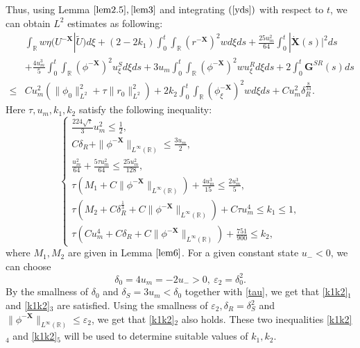 \documentclass[10pt,reqno]{amsart}
\numberwithin{equation}{section}
\begin{document}
	Thus, using Lemma $\ref{lem2.5},\ref{lem3}$ and integrating $(\ref{yds})$ with respect to $t$, we can obtain $L^2$ estimates as following:
	\begin{equation}\label{zero}
		\begin{aligned}
			&\int_{\mathbb{R}}w\eta(U^{-\mathbf{X}}|\tilde{U})d\xi+ \left(2-2k_{1}\right)\int_0^t\int_{\mathbb{R}}(r^{-\mathbf{X}})^2wd\xi ds + \frac{25u_m^2}{64}\int_0^t |\dot{\mathbf{X}}(s)|^2 ds \\
			&+ \frac{4u_m^3}{5}\int_0^t \int_{\mathbb{R}} (\phi^{-\mathbf{X}})^2u^S_{\xi}d\xi ds+3u_m\int_0^t \int_{\mathbb{R}} (\phi^{-\mathbf{X}})^2wu^R_\xi d\xi ds+2\int_0^t\mathbf{G}^{SR}(s)ds \\
			\leq& Cu_m^2 (\|\phi_0\|_{L^2}^2+\tau\|r_0\|_{L^2}^2 )+2k_2\int_{0}^t\int_{\mathbb{R}}\left(\phi_{\xi}^{-\mathbf{X}}\right)^2wd\xi ds+Cu_m^2\delta_R^{\frac{8}{33}}.
		\end{aligned}
	\end{equation} 
	Here $\tau,u_{m},k_1,k_2$ satisfy the following inequality:
	\begin{equation}\label{k1k2}
		\left\{\begin{array}{l}
			\frac{224\sqrt{\tau}}{3}u_m^2\leq \frac{1}{2} ,
			\\C\delta _R+\|\phi^{-\mathbf{X}}\|_{L^{\infty }(\mathbb{R})}\leq \frac{3u_m}{2}, 
			\\\frac{u_m^2}{64}+\frac{5\tau u_m^2}{64}\leq \frac{25u_m^2}{128},  
			\\\tau\left(M_1+C\|\phi^{-\mathbf{X}}\|_{L^{\infty }(\mathbb{R})} \right)+\frac{4u_m^3}{15}\leq \frac{2u_m^3}{5} ,
			\\\tau\left(M_2+C\delta _R^{\frac{1}{3}}+C\|\phi^{-\mathbf{X}}\|_{L^{\infty }(\mathbb{R})}\right)+C\tau u_m^4\leq k_1\leq1,
			\\\tau\left(C u_m^4+C\delta _R+C\|\phi^{-\mathbf{X}}\|_{L^{\infty }(\mathbb{R})}\right)+\frac{751}{900}\leq k_2,  
		\end{array}\right.
	\end{equation}
	where $M_{1},M_{2}$ are given in Lemma $\ref{lem6}$. For a given constant state $u_{-}<0$, we can choose $$\delta_{0}=4u_m=-2u_{-}>0,\ \varepsilon_{2}=\delta_{0}^2.$$ By the smallness of $\delta_{0}$ and $\delta_{S}=3u_m<\delta_{0}$ together with \eqref{tau}, we get that \eqref{k1k2}$_1$ and \eqref{k1k2}$_3$ are satisfied. Using the smallness of $\varepsilon_{2},\delta_{R}=\delta_{S}^2$ and $\|\phi^{-\mathbf{X}}\|_{L^{\infty }(\mathbb{R})}\leq \varepsilon_{2}$, we get that \eqref{k1k2}$_2$ also holds.  These two inequalities \eqref{k1k2}$_4$ and \eqref{k1k2}$_5$ will be used to determine suitable values of $k_1,k_2$. 
	
\end{document}
